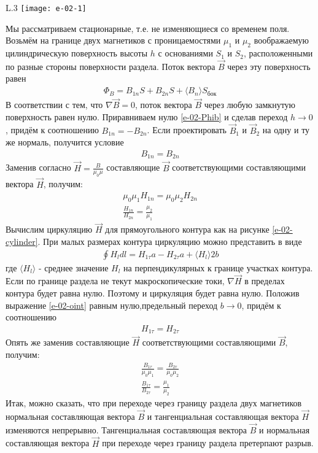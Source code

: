 \documentclass[__main__.tex]{subfiles}
\begin{document}
\begin{wrapfigure}{L}{.3\linewidth}
\texttt{[image: e-02-1]}
\caption{рисунок э-02}
\label{e-02-cylinder}
\end{wrapfigure}
Мы рассматриваем стационарные, т.е. не изменяющиеся со временем поля.\\
Возьмём на границе двух магнетиков с проницаемостями $\mu_1$ и $\mu_2$ воображаемую цилиндрическую поверхность высоты $h$ с основаниями $S_1$ и $S_2$, расположенными по разные стороны поверхности раздела. Поток вектора $\vec{B}$ через эту поверхность равен
\begin{gather}
\Phi_B = B_{1n}S + B_{2n}S + \langle B_n \rangle S_{бок}
\label{e-02-Phib}
\end{gather}
В соответствии с тем, что $\nabla \vec{B} = 0$, поток вектора $\vec{B}$ через любую замкнутую поверхность равен нулю. Приравниваем нулю \ref{e-02-Phib} и сделав переход $h \rightarrow 0$, придём к соотношению $B_{1n} = -B_{2n}$. Если проектировать $\vec{B}_1$ и $\vec{B}_2$ на одну и ту же нормаль, получится условие
\begin{gather*}
B_{1n} = B_{2n}
\end{gather*}
Заменив согласно $\vec{H} = \frac{B}{\mu_0\mu}$ составляющие $\vec{B}$ соответствующими составляющими вектора $\vec{H}$, получим:
\begin{gather*}
\mu_0 \mu_1 H_{1n} = \mu_0 \mu_2 H_{2n}\\
\frac{H_{1n}}{H_{2n}} = \frac{\mu_2}{\mu_1}
\end{gather*}
Вычислим  циркуляцию $\vec{H}$ для прямоугольного контура как на рисунке \ref{e-02-cylinder}. При малых размерах контура циркуляцию можно представить в виде
\begin{gather}
\oint{H_ldl} = H_{1\tau}a - H_{2\tau}a + \langle H_l \rangle 2b
\label{e-02-oint}
\end{gather}
где $\langle H_l \rangle$ - среднее значение $H_l$ на перпендикулярных к границе участках контура. Если по границе раздела не текут макроскопические токи, $\nabla \vec{H}$ в пределах контура будет равна нулю. Поэтому и циркуляция будет равна нулю. Положив выражение \ref{e-02-oint} равным нулю,предельный переход $b \rightarrow 0$, придём к соотношению
\begin{gather*}
H_{1\tau} = H_{2\tau}
\end{gather*}
Опять же заменив составляющие $\vec{H}$ соответствующими составляющими $\vec{B}$, получим:
\begin{gather*}
\frac{B_{1\tau}}{\mu_0\mu_1} = \frac{B_{2\tau}}{\mu_0\mu_2}\\
\frac{B_{1\tau}}{B_{2\tau}} = \frac{\mu_1}{\mu_2}
\end{gather*}
Итак, можно сказать, что при переходе через границу раздела двух магнетиков нормальная составляющая вектора $\vec{B}$ и тангенциальная составляющая вектора $\vec{H}$ изменяются непрерывно. Тангенциальная составляющая вектора $\vec{B}$ и нормальная составляющая вектора $\vec{H}$ при переходе через границу раздела претерпают разрыв. 
\end{document}
